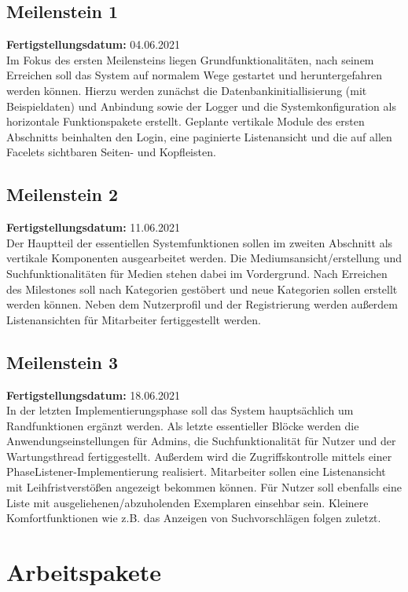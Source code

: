 \documentclass{article}
\begin{document}
\subsection{Meilenstein 1}
\textbf{Fertigstellungsdatum:} 04.06.2021 \\
Im Fokus des ersten Meilensteins liegen Grundfunktionalitäten, nach seinem Erreichen soll das System auf normalem Wege gestartet und heruntergefahren werden können. Hierzu werden zunächst die Datenbankinitiallisierung (mit Beispieldaten) und Anbindung sowie der Logger und die Systemkonfiguration als horizontale Funktionspakete erstellt. Geplante vertikale Module des ersten Abschnitts beinhalten den Login, eine paginierte Listenansicht und die auf allen Facelets sichtbaren Seiten- und Kopfleisten. 
\subsection{Meilenstein 2}
\textbf{Fertigstellungsdatum:} 11.06.2021 \\
Der Hauptteil der essentiellen Systemfunktionen sollen im zweiten Abschnitt als vertikale Komponenten ausgearbeitet werden. Die Mediumsansicht/erstellung und Suchfunktionalitäten für Medien stehen dabei im Vordergrund. Nach Erreichen des Milestones soll nach Kategorien gestöbert und neue Kategorien sollen erstellt werden können. Neben dem Nutzerprofil und der Registrierung werden außerdem Listenansichten für Mitarbeiter fertiggestellt werden.
\subsection{Meilenstein 3}
\textbf{Fertigstellungsdatum:} 18.06.2021 \\
In der letzten Implementierungsphase soll das System hauptsächlich um Randfunktionen ergänzt werden. Als letzte essentieller Blöcke werden die Anwendungseinstellungen für Admins, die Suchfunktionalität für Nutzer und der Wartungsthread fertiggestellt. Außerdem wird die Zugriffskontrolle mittels einer PhaseListener-Implementierung realisiert. Mitarbeiter sollen eine Listenansicht mit  Leihfristverstößen angezeigt bekommen können. Für Nutzer soll ebenfalls eine Liste mit ausgeliehenen/abzuholenden Exemplaren einsehbar sein. Kleinere Komfortfunktionen wie z.B. das Anzeigen von Suchvorschlägen folgen zuletzt.

\section{Arbeitspakete}
\end{document}
